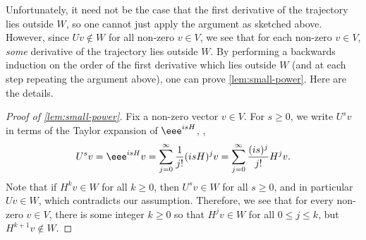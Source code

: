 \documentclass{toc}
\theoremstyle{plain}
\numberwithin{equation}{section}
\theoremstyle{definition}
\begin{document}
Unfortunately, it need not be the case that the first derivative of the trajectory lies outside $W$, so one cannot just apply the argument as sketched above. However, since $Uv \notin W$ for all non-zero $v \in V$, we see that for each non-zero $v \in V$, \emph{some} derivative of the trajectory lies outside $W$. By performing a backwards induction on the order of the first derivative which lies outside $W$ (and at each step repeating the argument above), one can prove \cref{lem:small-power}. Here are the details.
\begin{proof}[Proof of \cref{lem:small-power}]
    Fix a non-zero vector $v \in V$. For $s \geq 0$, we write $U^s v$ in terms of the Taylor expansion of $\eee^{isH}$, \ie,
    \[
        U^s v = \eee^{isH} v = \sum_{j=0}^\infty \frac{1}{j!} (isH)^j v= \sum_{j=0}^\infty \frac{(is)^j}{j!} H^j v.
    \]
    Note that if $H^k v\in W$ for all $k \geq 0$, then $U^s v \in W$ for all $s \geq 0$, and in particular $Uv \in W$, which contradicts our assumption. Therefore, we see that for every non-zero $v \in V$, there is some integer $k \geq 0$ so that $H^j v \in W$ for all $0 \leq j \leq k$, but $H^{k+1}v \notin W$.


\end{proof}
\end{document}
